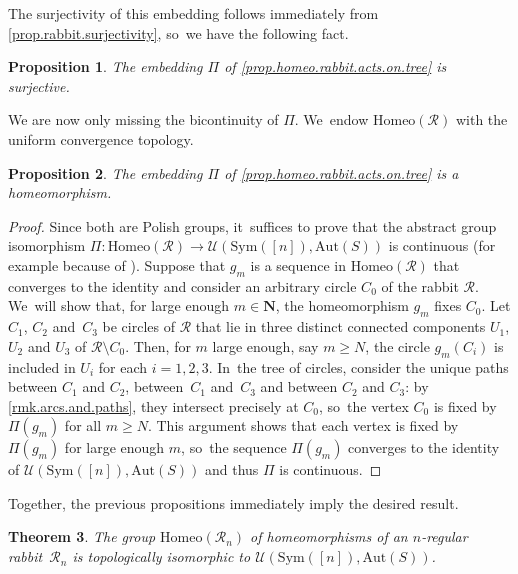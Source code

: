\documentclass[JEP,XML,SOM,Unicode,NoFloatCountersInSection,published]{cedram}
\theoremstyle{plain}
\newtheorem{theorem}{Theorem}[section]
\newtheorem{proposition}[theorem]{Proposition}
\theoremstyle{definition}
\theoremstyle{remark}
\newcommand{\Aut}{\mathrm{Aut}}
\newcommand{\Sym}{\mathrm{Sym}}
\newcommand{\Homeo}{\mathrm{Homeo}}
\newcommand{\R}{\mathcal{R}}
\newcommand{\U}{\mathcal{U}}
\begin{document}
The surjectivity of this embedding follows immediately from \cref{prop.rabbit.surjectivity}, so~we have the following fact.

\begin{proposition}
\label{prop.rabbit.embedding.is.surjective}
The embedding $\Pi$ of \cref{prop.homeo.rabbit.acts.on.tree} is surjective.
\end{proposition}

We are now only missing the bicontinuity of $\Pi$. We~endow $\Homeo(\R)$ with the uniform convergence topology.

\begin{proposition}
\label{prop.rabbit.embedding.is.continuous}
The embedding $\Pi$ of \cref{prop.homeo.rabbit.acts.on.tree} is a homeomorphism.
\end{proposition}

\begin{proof}
Since both are Polish groups, it~suffices to prove that the abstract group isomorphism $\Pi \colon \Homeo(\R) \to \U(\Sym([n]),\Aut(S))$ is continuous (for example because of \cite[Cor.\,2.3.4]{MR2455198}).
Suppose that $g_m$ is a sequence in $\Homeo(\R)$ that converges to the identity and consider an arbitrary circle $C_0$ of the rabbit $\R$. We~will show that, for large enough $m \in \mathbf{N}$, the homeomorphism $g_m$ fixes $C_0$.
Let $C_1$, $C_2$ and~$C_3$ be circles of $\R$ that lie in three distinct connected components $U_1$, $U_2$ and $U_3$ of $\R \setminus C_0$.
Then, for $m$ large enough, say $m \geq N$, the circle $g_m (C_i)$ is included in $U_i$ for each $i = 1, 2, 3$. In~the tree of circles, consider the unique paths between $C_1$ and $C_2$, between~$C_1$ and~$C_3$ and between $C_2$ and $C_3$:
by \cref{rmk.arcs.and.paths}, they intersect precisely at $C_0$, so~the vertex $C_0$ is fixed by $\Pi(g_m)$ for all $m \geq N$.
This argument shows that each vertex is fixed by $\Pi(g_m)$ for large enough $m$, so~the sequence $\Pi(g_m)$ converges to the identity of $\U(\Sym([n]),\Aut(S))$ and thus $\Pi$ is continuous.
\end{proof}

Together, the previous propositions immediately imply the desired result.

\begin{theorem}
\label{thm.homeo.rabbits.are.auto.trees}
The group $\Homeo(\R_n)$ of homeomorphisms of an $n$-regular rabbit~$\R_n$ is topologically isomorphic to $\U (\Sym([n]),\Aut(S))$.
\end{theorem}
\end{document}
